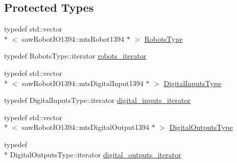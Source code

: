 \subsection*{Protected Types}
\begin{DoxyCompactItemize}
\item 
typedef std\-::vector\\*
$<$ saw\-Robot\-I\-O1394\-::mts\-Robot1394 $\ast$ $>$ \hyperlink{classmts_robot_i_o1394_ab8da6d2d438f82df01169c5bd528c9b3}{Robots\-Type}
\item 
typedef Robots\-Type\-::iterator \hyperlink{classmts_robot_i_o1394_a7f8edd25871894ed25f59c68d3c49ece}{robots\-\_\-iterator}
\item 
typedef std\-::vector\\*
$<$ saw\-Robot\-I\-O1394\-::mts\-Digital\-Input1394 $\ast$ $>$ \hyperlink{classmts_robot_i_o1394_ad8b711c653d6fc68084cbe7817e066b9}{Digital\-Inputs\-Type}
\item 
typedef Digital\-Inputs\-Type\-::iterator \hyperlink{classmts_robot_i_o1394_abd444ca2070d97fbd3c0d7d23049efcc}{digital\-\_\-inputs\-\_\-iterator}
\item 
typedef std\-::vector\\*
$<$ saw\-Robot\-I\-O1394\-::mts\-Digital\-Output1394 $\ast$ $>$ \hyperlink{classmts_robot_i_o1394_af0825d8e6c2f7bb0ff1fcd85319ffa30}{Digital\-Outputs\-Type}
\item 
typedef \\*
Digital\-Outputs\-Type\-::iterator \hyperlink{classmts_robot_i_o1394_a48bc60cd954bf3778f58163beb05985a}{digital\-\_\-outputs\-\_\-iterator}
\end{DoxyCompactItemize}
